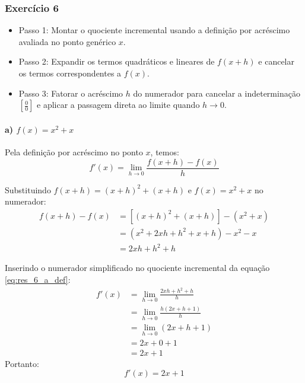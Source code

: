 \vspace{0.6cm}
\subsubsection*{Exercício 6}

\begin{estrategiabox}
  \begin{itemize}[noitemsep, topsep=2pt]
    \item Passo 1: Montar o quociente incremental usando a definição por acréscimo avaliada no ponto genérico $x$.
    \item Passo 2: Expandir os termos quadráticos e lineares de $f(x + h)$ e cancelar os termos correspondentes a $f(x)$.
    \item Passo 3: Fatorar o acréscimo $h$ do numerador para cancelar a indeterminação $\left[\frac{0}{0}\right]$ e aplicar a passagem direta ao limite quando $h \to 0$.
  \end{itemize}
\end{estrategiabox}

\paragraph{a) $f(x) = x^2 + x$}

Pela definição por acréscimo no ponto $x$, temos:
\begin{equation}
f'(x) = \lim_{h \to 0} \frac{f(x + h) - f(x)}{h} \label{eq:res_6_a_def}
\end{equation}

Substituindo $f(x + h) = (x + h)^2 + (x + h)$ e $f(x) = x^2 + x$ no numerador:
\begin{align*}
f(x + h) - f(x) &= \left[(x + h)^2 + (x + h)\right] - (x^2 + x) \\
&= \left(x^2 + 2xh + h^2 + x + h\right) - x^2 - x \\
&= 2xh + h^2 + h
\end{align*}

Inserindo o numerador simplificado no quociente incremental da equação \eqref{eq:res_6_a_def}:
\begin{align*}
f'(x) &= \lim_{h \to 0} \frac{2xh + h^2 + h}{h} \\
      &= \lim_{h \to 0} \frac{h(2x + h + 1)}{h} \\
      &= \lim_{h \to 0} (2x + h + 1) \\
      &= 2x + 0 + 1 \\
      &= 2x + 1
\end{align*}
Portanto:
\[
  f'(x) = 2x + 1
\]

